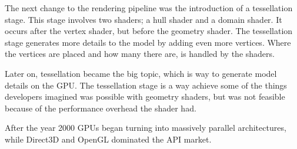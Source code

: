 The next change to the rendering pipeline was the introduction of a tessellation stage.
This stage involves two shaders; a hull shader and a domain shader.
It occurs after the vertex shader, but before the geometry shader.
The tessellation stage generates more details to the model by adding even more vertices.
Where the vertices are placed and how many there are, is handled by the shaders.

Later on, tessellation became the big topic, which is way to generate model details on the \gls{GPU}.
The tessellation stage is a way achieve some of the things developers imagined was possible with geometry shaders, but was not feasible because of the performance overhead the shader had.

After the year 2000 \glspl{GPU} began turning into massively parallel architectures, while Direct3D and OpenGL dominated the \gls{API} market. 